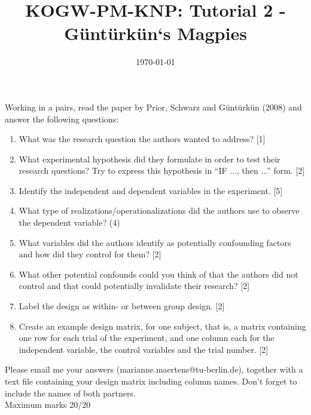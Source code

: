 \documentclass[12pt,english]{scrartcl}
\title{KOGW-PM-KNP: Tutorial 2 - G{\"u}nt{\"u}rk{\"u}n`s Magpies}
\author{}
\date{\today}
\begin{document}
\maketitle

Working in a pairs, read the paper by Prior, Schwarz and G{\"u}nt{\"u}rk{\"u}n (2008) and answer the following questions:
\begin{enumerate}
 \item What was the research question the authors wanted to address? [1]
 \item What experimental hypothesis did they formulate in order to test their research questions? Try to express this hypothesis in ``IF ..., then ...'' form. [2]
 \item Identify the independent and dependent variables in the experiment. [5]
 \item What type of realizations/operationalizations did the authors use to observe the dependent variable? (4)
 \item What variables did the authors identify as potentially confounding factors and how did they control for them? [2]
 \item What other potential confounds could you think of that the authors did not control and that could potentially invalidate their research? [2]
 \item Label the design as within- or between group design. [2]
 \item Create an example design matrix, for one subject, that is, a matrix containing one row for each trial of the experiment, and one column each for the independent variable, the control variables and the trial number. [2]
 \end{enumerate}


Please email me your answers (marianne.maertens@tu-berlin.de), together with a text file containing your design matrix including column names. Don't forget to include the names of both partners. \\
Maximum marks 20/20
\end{document}
